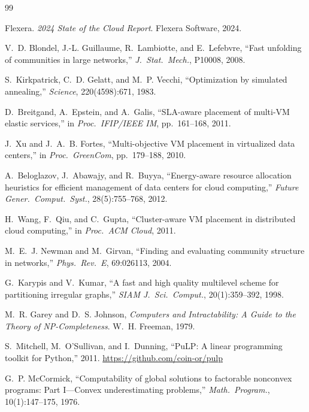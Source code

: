\documentclass[10pt,journal]{IEEEtran}
\begin{document}

\begin{thebibliography}{99}

Flexera. \textit{2024 State of the Cloud Report}. Flexera Software, 2024.

V.~D. Blondel, J.-L. Guillaume, R.~Lambiotte, and E.~Lefebvre,
``Fast unfolding of communities in large networks,''
\textit{J.~Stat.~Mech.}, P10008, 2008.

S.~Kirkpatrick, C.~D. Gelatt, and M.~P. Vecchi,
``Optimization by simulated annealing,'' \textit{Science}, 220(4598):671, 1983.

D.~Breitgand, A.~Epstein, and A.~Galis,
``SLA-aware placement of multi-VM elastic services,''
in \textit{Proc.~IFIP/IEEE IM}, pp.~161--168, 2011.

J.~Xu and J.~A.~B. Fortes,
``Multi-objective VM placement in virtualized data centers,''
in \textit{Proc.~GreenCom}, pp.~179--188, 2010.

A.~Beloglazov, J.~Abawajy, and R.~Buyya,
``Energy-aware resource allocation heuristics for efficient management of
data centers for cloud computing,''
\textit{Future Gener.~Comput.~Syst.}, 28(5):755--768, 2012.

H.~Wang, F.~Qiu, and C.~Gupta,
``Cluster-aware VM placement in distributed cloud computing,''
in \textit{Proc.~ACM Cloud}, 2011.

M.~E.~J. Newman and M.~Girvan,
``Finding and evaluating community structure in networks,''
\textit{Phys.~Rev.~E}, 69:026113, 2004.

G.~Karypis and V.~Kumar,
``A fast and high quality multilevel scheme for partitioning irregular graphs,''
\textit{SIAM J.~Sci.~Comput.}, 20(1):359--392, 1998.

M.~R. Garey and D.~S. Johnson,
\textit{Computers and Intractability: A Guide to the Theory of NP-Completeness}.
W.~H. Freeman, 1979.

S.~Mitchell, M.~O'Sullivan, and I.~Dunning,
``PuLP: A linear programming toolkit for Python,'' 2011.
\url{https://github.com/coin-or/pulp}

G.~P. McCormick,
``Computability of global solutions to factorable nonconvex programs:
Part I---Convex underestimating problems,''
\textit{Math.~Program.}, 10(1):147--175, 1976.


\end{thebibliography}
\end{document}
